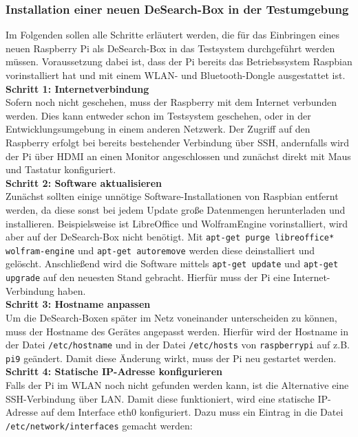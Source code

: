 \subsubsection{Installation einer neuen DeSearch-Box in der Testumgebung}\label{sssec:schritte}
Im Folgenden sollen alle Schritte erläutert werden, die für das Einbringen eines neuen Raspberry Pi als DeSearch-Box in das Testsystem durchgeführt werden müssen.
Voraussetzung dabei ist, dass der Pi bereits das Betriebssystem Raspbian vorinstalliert hat und mit einem WLAN- und Bluetooth-Dongle ausgestattet ist.\\
\textbf{Schritt 1: Internetverbindung}\\
Sofern noch nicht geschehen, muss der Raspberry mit dem Internet verbunden werden. Dies kann entweder schon im Testsystem geschehen, oder in der Entwicklungsumgebung in einem anderen Netzwerk. Der Zugriff auf den Raspberry erfolgt bei bereits bestehender Verbindung über SSH, andernfalls wird der Pi über HDMI an einen Monitor angeschlossen und zunächst direkt mit Maus und Tastatur konfiguriert. \\
\textbf{Schritt 2: Software aktualisieren}\\
Zunächst sollten einige unnötige Software-Installationen von Raspbian entfernt werden, da diese sonst bei jedem Update große Datenmengen herunterladen und installieren. Beispielsweise ist LibreOffice und WolframEngine vorinstalliert, wird aber auf der DeSearch-Box nicht benötigt. Mit \texttt{apt-get purge libreoffice* wolfram-engine} und \texttt{apt-get autoremove} werden diese deinstalliert und gelöscht. Anschließend wird die Software mittels \texttt{apt-get update} und \texttt{apt-get upgrade} auf den neuesten Stand gebracht. Hierfür muss der Pi eine Internet-Verbindung haben.\\
\textbf{Schritt 3: Hostname anpassen}\\
Um die DeSearch-Boxen später im Netz voneinander unterscheiden zu können, muss der Hostname des Gerätes angepasst werden. Hierfür wird der Hostname in der Datei \texttt{/etc/hostname} und in der Datei \texttt{/etc/hosts} von \texttt{raspberrypi} auf z.B. \texttt{pi9} geändert. Damit diese Änderung wirkt, muss der Pi neu gestartet werden.\\
\textbf{Schritt 4: Statische IP-Adresse konfigurieren}\\
Falls der Pi im WLAN noch nicht gefunden werden kann, ist die Alternative eine SSH-Verbindung über LAN. Damit diese funktioniert, wird eine statische IP-Adresse auf dem Interface eth0 konfiguriert. Dazu muss ein Eintrag in die Datei \texttt{/etc/network/interfaces} gemacht werden:\\
